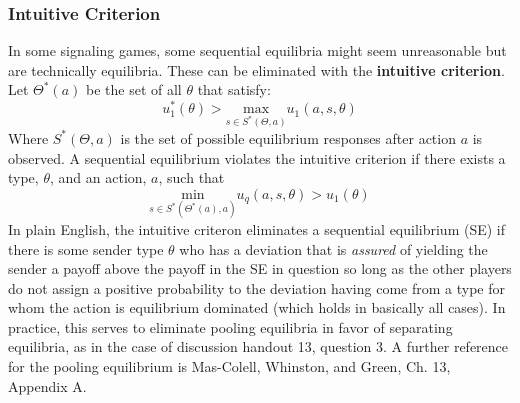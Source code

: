 \documentclass{article}
\newcommand{\red}[1]{{\color{red}#1}}
\begin{document}
\subsubsection{Intuitive Criterion}
In some signaling games, some sequential equilibria might seem unreasonable but are technically equilibria. These can be eliminated with the \textbf{intuitive criterion}. Let $\Theta^*(a)$ be the set of all $\theta$ that satisfy:
\[
	u_1^*(\theta) > \underset{s\in S^*(\Theta,a)}{\text{max}}u_1(a,s,\theta)
\]
Where $S^*(\Theta,a)$ is the set of possible equilibrium responses after action $a$ is observed. A sequential equilibrium violates the intuitive criterion if there exists a type, $\theta$, and an action, $a$, such that 
\[
	\underset{s\in S^*(\Theta^*(a),a)}{\text{min}}u_q(a,s,\theta)>u_1(\theta)
\]
In plain English, the intuitive criteron eliminates a sequential equilibrium (SE) if there is some sender type $\theta$ who has a deviation that is \textit{assured} of yielding the sender a payoff above the payoff in the SE in question so long as the other players do not assign a positive probability to the deviation having come from a type for whom the action is equilibrium dominated (which holds in basically all cases). In practice, this serves to eliminate pooling equilibria in favor of separating equilibria, as in the case of \red{discussion handout 13, question 3}. A further reference for the pooling equilibrium is \red{Mas-Colell, Whinston, and Green, Ch. 13, Appendix A}.

\end{document}
